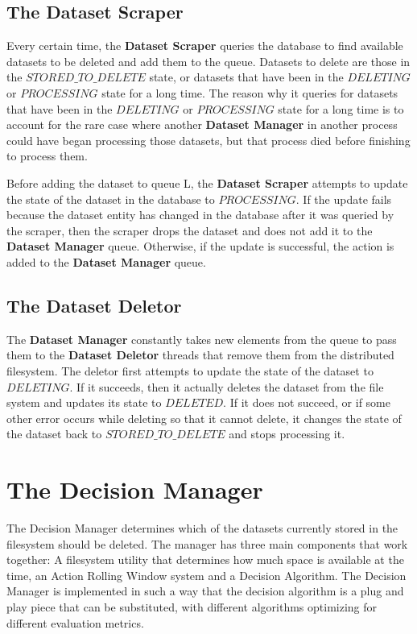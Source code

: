 \subsection{The Dataset Scraper}
Every certain time, the \textbf{Dataset Scraper} queries the database to find available datasets to be deleted and add them to the queue. Datasets to delete are those in the $STORED\_TO\_DELETE$ state, or datasets that have been in the $DELETING$ or $PROCESSING$ state for a long time. The reason why it queries for datasets that have been in the $DELETING$ or $PROCESSING$ state for a long time is to account for the rare case where another \textbf{Dataset Manager} in another process could have began processing those datasets, but that process died before finishing to process them.

Before adding the dataset to queue L, the \textbf{Dataset Scraper} attempts to update the state of the dataset in the database to $PROCESSING$. If the update fails because the dataset entity has changed in the database after it was queried by the scraper, then the scraper drops the dataset and does not add it to the \textbf{Dataset Manager} queue. Otherwise, if the update is successful, the action is added to the \textbf{Dataset Manager} queue.

\subsection{The Dataset Deletor}
The \textbf{Dataset Manager} constantly takes new elements from the queue to pass them to the \textbf{Dataset Deletor} threads that remove them from the distributed filesystem. The deletor first attempts to update the state of the dataset to $DELETING$. If it succeeds, then it actually deletes the dataset from the file system and updates its state to $DELETED$. If it does not succeed, or if some other error occurs while deleting so that it cannot delete, it changes the state of the dataset back to $STORED\_TO\_DELETE$ and stops processing it.

\section{The Decision Manager}
The Decision Manager determines which of the datasets currently stored in the filesystem should be deleted. The manager has three main components that work together: A filesystem utility that determines how much space is available at the time, an Action Rolling Window system and a Decision Algorithm. The Decision Manager is implemented in such a way that the decision algorithm is a plug and play piece that can be substituted, with different algorithms optimizing for different evaluation metrics.

